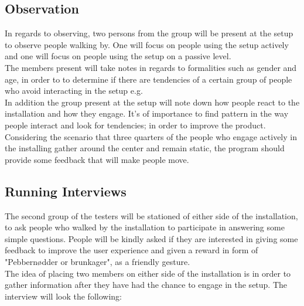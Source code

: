 \subsection{Observation}
In regards to observing, two persons from the group will be present at the setup to observe people walking by. One will focus on people using the setup actively and one will focus on people using the setup on a passive level.\\
The members present will take notes in regards to formalities such as gender and age, in order to to determine if there are tendencies of a certain group of people who avoid interacting in the setup e.g.\\
In addition the group present at the setup will note down how people react to the installation and how they engage. It's of importance to find pattern in the way people interact and look for tendencies; in order to improve the product. Considering the scenario that three quarters of the people who engage actively in the installing gather around the center and remain static, the program should provide some feedback that will make people move.

\subsection{Running Interviews}
The second group of the testers will be stationed of either side of the installation, to ask people who walked by the installation to participate in answering some simple  questions. People will be kindly asked if they are interested in giving some feedback to improve the user experience and given a reward in form of "Pebbern{\o}dder or brunkager", as a friendly gesture.\\
The idea of placing two members on either side of the installation is in order to gather information after they have had the chance to engage in the setup. The interview will look the following:

